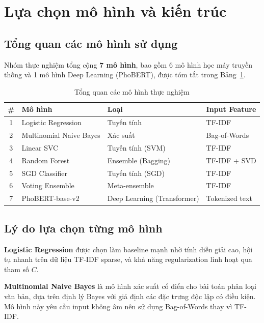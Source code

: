 \section{Lựa chọn mô hình và kiến trúc}

\subsection{Tổng quan các mô hình sử dụng}
Nhóm thực nghiệm tổng cộng \textbf{7 mô hình}, bao gồm 6 mô hình học máy truyền thống và 1 mô hình Deep Learning (PhoBERT), được tóm tắt trong Bảng~\ref{tab:model_overview}.

\begin{table}[H]
\centering
\caption{Tổng quan các mô hình thực nghiệm}
\label{tab:model_overview}
\begin{tabular}{|c|l|l|l|}
\hline
\textbf{\#} & \textbf{Mô hình} & \textbf{Loại} & \textbf{Input Feature} \\
\hline
1 & Logistic Regression & Tuyến tính & TF-IDF \\
2 & Multinomial Naive Bayes & Xác suất & Bag-of-Words \\
3 & Linear SVC & Tuyến tính (SVM) & TF-IDF \\
4 & Random Forest & Ensemble (Bagging) & TF-IDF + SVD \\
5 & SGD Classifier & Tuyến tính (SGD) & TF-IDF \\
6 & Voting Ensemble & Meta-ensemble & TF-IDF \\
7 & PhoBERT-base-v2 & Deep Learning (Transformer) & Tokenized text \\
\hline
\end{tabular}
\end{table}

\subsection{Lý do lựa chọn từng mô hình}

\textbf{Logistic Regression} \parencite{cox1958lr} được chọn làm baseline mạnh nhờ tính diễn giải cao, hội tụ nhanh trên dữ liệu TF-IDF \parencite{salton1988tfidf} sparse, và khả năng regularization linh hoạt qua tham số $C$.

\textbf{Multinomial Naive Bayes} \parencite{mccallum1998nb} là mô hình xác suất cổ điển cho bài toán phân loại văn bản, dựa trên định lý Bayes với giả định các đặc trưng độc lập có điều kiện. Mô hình này yêu cầu input không âm nên sử dụng Bag-of-Words thay vì TF-IDF.

